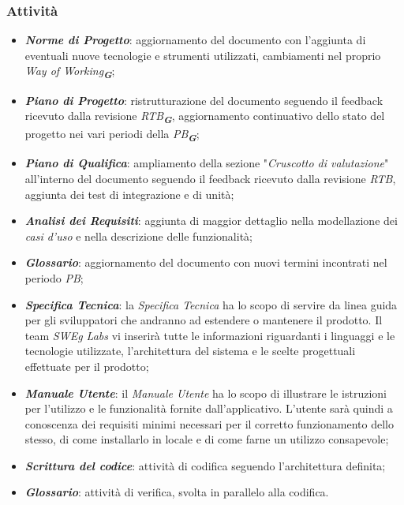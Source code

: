 \subsubsection{Attività}

\begin{itemize}
\item \textbf{\emph{Norme di Progetto}}: aggiornamento del documento con l’aggiunta di eventuali nuove tecnologie e strumenti utilizzati, cambiamenti nel proprio {\emph{Way of Working}}\textsubscript{\textit{\textbf{G}}};
\item \textbf{\emph{Piano di Progetto}}: ristrutturazione del documento seguendo il feedback ricevuto dalla revisione {\emph{RTB}}\textsubscript{\textit{\textbf{G}}}, aggiornamento continuativo dello stato del progetto nei vari periodi della {\emph{PB}}\textsubscript{\textit{\textbf{G}}};
\item \textbf{\emph{Piano di Qualifica}}: ampliamento della sezione "\emph{Cruscotto di valutazione}" all’interno del documento seguendo il feedback ricevuto dalla revisione \emph{RTB}, aggiunta dei test di integrazione e di unità;
\item \textbf{\emph{Analisi dei Requisiti}}: aggiunta di maggior dettaglio nella modellazione dei \emph{casi d’uso} e nella descrizione delle funzionalità;
\item \textbf{\emph{Glossario}}: aggiornamento del documento con nuovi termini incontrati nel periodo \emph{PB};
\item \textbf{\emph{Specifica Tecnica}}: la \emph{Specifica Tecnica} ha lo scopo di servire da linea guida per gli sviluppatori che andranno ad estendere o mantenere il prodotto. Il team \emph{SWEg Labs} vi inserirà tutte le informazioni riguardanti i linguaggi e le tecnologie utilizzate, l’architettura del sistema e le scelte progettuali effettuate per il prodotto;
\item \textbf{\emph{Manuale Utente}}: il \emph{Manuale Utente} ha lo scopo di illustrare le istruzioni per l’utilizzo e le funzionalità fornite dall’applicativo. L’utente sarà quindi a conoscenza dei requisiti minimi necessari per il corretto funzionamento dello stesso, di come installarlo in locale e di come farne un utilizzo consapevole;
\item \textbf{\emph{Scrittura del codice}}: attività di codifica seguendo l’architettura definita;
\item \textbf{\emph{Glossario}}: attività di verifica, svolta in parallelo alla codifica.
\end{itemize}

